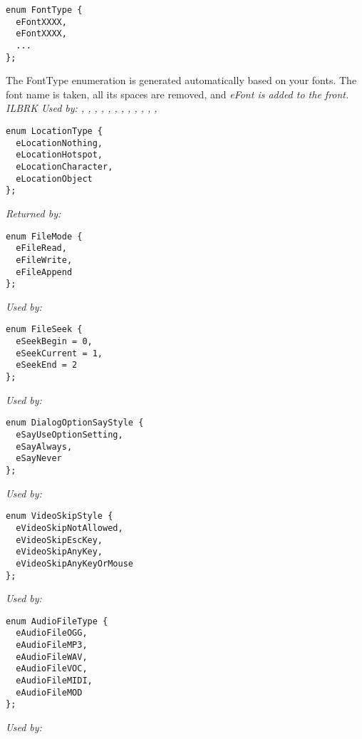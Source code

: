 \begin{verbatim}
enum FontType {
  eFontXXXX,
  eFontXXXX,
  ...
};
\end{verbatim}
The FontType enumeration is generated automatically based on your fonts.
The font name is taken, all its spaces are removed, and \it{eFont} is added
to the front. ILBRK
\it{Used by:} ,
,
,
,
,
,
,
,
,
,
,
,


\begin{verbatim}
enum LocationType {
  eLocationNothing,
  eLocationHotspot,
  eLocationCharacter,
  eLocationObject
};
\end{verbatim}
\it{Returned by:} 

\begin{verbatim}
enum FileMode {
  eFileRead,
  eFileWrite,
  eFileAppend
};
\end{verbatim}
\it{Used by:} 

\begin{verbatim}
enum FileSeek {
  eSeekBegin = 0,
  eSeekCurrent = 1,
  eSeekEnd = 2
};
\end{verbatim}
\it{Used by:} 

\begin{verbatim}
enum DialogOptionSayStyle {
  eSayUseOptionSetting,
  eSayAlways,
  eSayNever
};
\end{verbatim}
\it{Used by:} 

\begin{verbatim}
enum VideoSkipStyle {
  eVideoSkipNotAllowed,
  eVideoSkipEscKey,
  eVideoSkipAnyKey,
  eVideoSkipAnyKeyOrMouse
};
\end{verbatim}
\it{Used by:} 

\begin{verbatim}
enum AudioFileType {
  eAudioFileOGG,
  eAudioFileMP3,
  eAudioFileWAV,
  eAudioFileVOC,
  eAudioFileMIDI,
  eAudioFileMOD
};
\end{verbatim}
\it{Used by:} 

